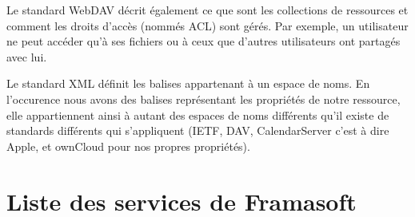 \documentclass[10pt,a4paper, twoside]{report}
\begin{document}
	Le standard WebDAV décrit également ce que sont les collections de ressources et comment les droits d'accès (nommés ACL) sont gérés. Par exemple, un utilisateur ne peut accéder qu'à ses fichiers ou à ceux que d'autres utilisateurs ont partagés avec lui.
	
	Le standard XML définit les balises appartenant à un espace de noms. En l'occurence nous avons des balises représentant les propriétés de notre ressource, elle appartiennent ainsi à autant des espaces de noms différents qu'il existe de standards différents qui s'appliquent (IETF, DAV, CalendarServer c'est à dire Apple, et ownCloud pour nos propres propriétés).
	
	\section{Liste des services de Framasoft}
	\thispagestyle{empty}
	\label{sec:listeservices}
	
\end{document}
